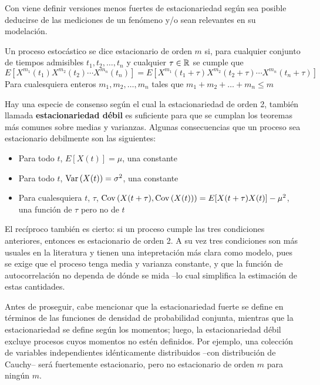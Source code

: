 
Con viene definir versiones menos fuertes de estacionariedad seg\'un sea posible deducirse de
las mediciones de un fen\'omeno y/o sean relevantes en su modelaci\'on.

\begin{defn}
Un proceso estoc\'astico se dice estacionario de orden $m$ si, para cualquier 
conjunto de tiempos admisibles $t_1,t_2,\dots,t_n$ y cualquier $\tau \in \mathbb{R}$
se cumple que
\begin{equation*}
E\left[ X^{m_1}(t_1)X^{m_2}(t_2)\cdots X^{m_n}(t_n) \right]
=
E\left[ X^{m_1}(t_1+\tau)X^{m_2}(t_2+\tau)\cdots X^{m_n}(t_n+\tau) \right]
\end{equation*}
Para cualesquiera enteros $m_1,m_2,\dots,m_n$ tales que $m_1+m_2+\dots+m_n \leq m$
\end{defn}

Hay una especie de consenso seg\'un el cual la estacionariedad de orden 2, tambi\'en
llamada \textbf{estacionariedad d\'ebil} es suficiente para
que se cumplan los teoremas m\'as comunes sobre medias y varianzas.
Algunas consecuencias que un
proceso sea estacionario debilmente son las siguientes:
\begin{itemize}
\item Para todo $t$, $E[X(t)] = \mu$, una constante
\item Para todo $t$, $\mathrm{Var}\left( X(t) \right) = \sigma^{2}$, una constante
\item Para cualesquiera $t$, $\tau$, $\mathrm{Cov}\left( X(t+\tau),\mathrm{Cov}\left( X(t) \right) \right) = E[X(t+\tau)X(t)] - \mu^{2}$, 
una funci\'on de $\tau$ pero no de $t$
\end{itemize}

El rec\'iproco tambi\'en es cierto: si un proceso cumple las tres condiciones anteriores,
entonces es estacionario de orden 2. A su vez tres condiciones son m\'as usuales en la literatura
y tienen una intepretaci\'on m\'as clara como modelo, pues se exige que el proceso tenga media
y varianza constante, y que la funci\'on de autocorrelaci\'on no dependa de d\'onde se mida --lo
cual simplifica la estimaci\'on de estas cantidades.

Antes de proseguir, cabe mencionar que la estacionariedad fuerte se define
en t\'erminos de las funciones de densidad de probabilidad conjunta, mientras que la 
estacionariedad se define seg\'un los momentos; luego, la estacionariedad d\'ebil excluye 
procesos cuyos momentos no est\'en definidos. Por ejemplo, una colecci\'on de variables
independientes id\'enticamente distribuidos --con distribuci\'on de Cauchy-- ser\'a
fuertemente estacionario, pero no estacionario de orden $m$ para ning\'un $m$. 

